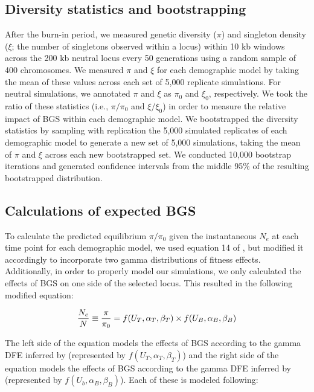 \documentclass[9pt,twocolumn,twoside]{rilabRxiv}
\begin{document}
\subsection{Diversity statistics and bootstrapping}

After the burn-in period, we measured genetic diversity ($\pi$) and singleton density ($\xi$; the number of singletons observed within a locus) within 10 kb windows across the 200 kb neutral locus every 50 generations using a random sample of 400 chromosomes.
We measured $\pi$ and $\xi$ for each demographic model by taking the mean of these values across each set of 5,000 replicate simulations.
For neutral simulations, we annotated $\pi$ and $\xi$ as $\pi_0$ and $\xi_0$, respectively.
We took the ratio of these statistics (i.e., $\pi/\pi_0$ and $\xi/\xi_0$) in order to measure the relative impact of BGS within each demographic model.
We bootstrapped the diversity statistics by sampling with replication the 5,000 simulated replicates of each demographic model to generate a new set of 5,000 simulations, taking the mean of $\pi$ and $\xi$ across each new bootstrapped set.
We conducted 10,000 bootstrap iterations and generated confidence intervals from the middle 95\% of the resulting bootstrapped distribution.

\subsection{Calculations of expected BGS}

To calculate the predicted equilibrium $\pi/\pi_0$ given the instantaneous $N_e$ at each time point for each demographic model, we used equation 14 of \citet{nordborg1996effect}, but modified it accordingly to incorporate two gamma distributions of fitness effects.
Additionally, in order to properly model our simulations, we only calculated the effects of BGS on one side of the selected locus.
This resulted in the following modified equation:


\begin{equation*}
    \frac{N_e}{N}\equiv\frac{\pi}{\pi_0}=f(U_T,\alpha_T,\beta_T)\times f(U_B,\alpha_B,\beta_B) \\
\end{equation*}
    
The left side of the equation models the effects of BGS according to the gamma DFE inferred by \citet{torgerson2009evolutionary} (represented by $f(U_T,\alpha_T,\beta_T)$) and the right side of the equation models the effects of BGS according to the gamma DFE inferred by \citet{boyko2008assessing} (represented by $f(U_b,\alpha_B,\beta_B)$).
Each of these is modeled following:
\end{document}
